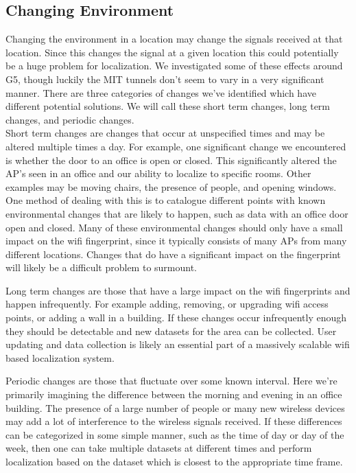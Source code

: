 \documentclass[11pt]{article}
\begin{document}
\subsection{Changing Environment}
Changing the environment in a location may change the signals received at that location. Since this changes the signal at a given location this could potentially be a huge problem for localization. We investigated some of these effects around G5, though luckily the MIT tunnels don’t seem to vary in a very significant manner. There are three categories of changes we’ve identified which have different potential solutions. We will call these short term changes, long term changes, and periodic changes.\\
Short term changes are changes that occur at unspecified times and may be altered multiple times a day. For example, one significant change we encountered is whether the door to an office is open or closed. This significantly altered the AP’s seen in an office and our ability to localize to specific rooms. Other examples may be moving chairs, the presence of people, and opening windows. One method of dealing with this is to catalogue different points with known environmental changes that are likely to happen, such as data with an office door open and closed. Many of these environmental changes should only have a small impact on the wifi fingerprint, since it typically consists of many APs from many different locations. Changes that do have a significant impact on the fingerprint will likely be a difficult problem to surmount.

Long term changes are those that have a large impact on the wifi fingerprints and happen infrequently. For example adding, removing, or upgrading wifi access points, or adding a wall in a building. If these changes occur infrequently enough they should be detectable and new datasets for the area can be collected. User updating and data collection is likely an essential part of a massively scalable wifi based localization system.

Periodic changes are those that fluctuate over some known interval. Here we’re primarily imagining the difference between the morning and evening in an office building. The presence of a large number of people or many new wireless devices may add a lot of interference to the wireless signals received. If these differences can be categorized in some simple manner, such as the time of day or day of the week, then one can take multiple datasets at different times and perform localization based on the dataset which is closest to the appropriate time frame.
\end{document}
